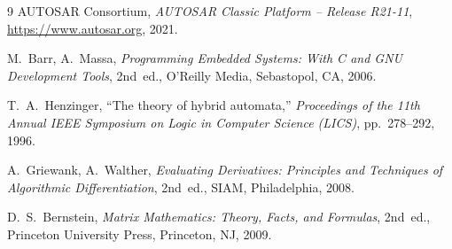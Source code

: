 ﻿\documentclass[12pt,a4paper]{article}
\theoremstyle{definition}
\begin{document}
\begin{thebibliography}{9}
  AUTOSAR Consortium,
  \emph{AUTOSAR Classic Platform -- Release R21-11},
  \url{https://www.autosar.org}, 2021.

  M.~Barr, A.~Massa,
  \emph{Programming Embedded Systems: With C and GNU Development Tools},
  2nd~ed., O'Reilly Media, Sebastopol, CA, 2006.

  T.~A.~Henzinger,
  ``The theory of hybrid automata,''
  \emph{Proceedings of the 11th Annual IEEE Symposium on Logic in Computer Science (LICS)},
  pp.~278--292, 1996.

  A.~Griewank, A.~Walther,
  \emph{Evaluating Derivatives: Principles and Techniques of Algorithmic Differentiation},
  2nd~ed., SIAM, Philadelphia, 2008.

  D.~S.~Bernstein,
  \emph{Matrix Mathematics: Theory, Facts, and Formulas},
  2nd~ed., Princeton University Press, Princeton, NJ, 2009.

\end{thebibliography}
\end{document}
